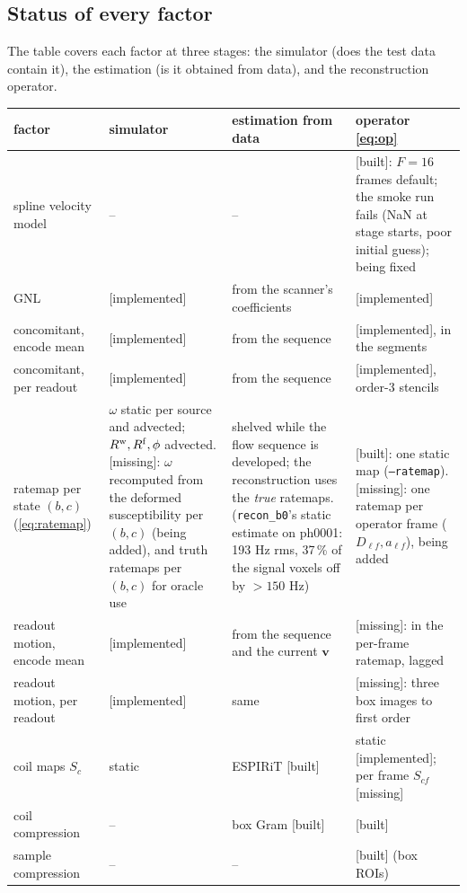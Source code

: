 \documentclass[11pt]{article}
\theoremstyle{remark}
\newcommand{\vv}{\bm v}
\newcommand{\st}[1]{\textsf{\small[#1]}}
\begin{document}
\subsection{Status of every factor}
\label{sec:chainstatus}

The table covers each factor at three stages: the simulator (does the test data contain it), the estimation (is it obtained from data), and the reconstruction operator.
\begin{center}\small
\begin{tabularx}{\linewidth}{@{}lXXX@{}}
\toprule
factor & simulator & estimation from data & operator \cref{eq:op}\\
\midrule
spline velocity model & -- & -- & \st{built}: $F=16$ frames default; the smoke run fails (NaN at stage starts, poor initial guess); being fixed\\
GNL & \st{implemented} & from the scanner's coefficients & \st{implemented}\\
concomitant, encode mean & \st{implemented} & from the sequence & \st{implemented}, in the segments\\
concomitant, per readout & \st{implemented} & from the sequence & \st{implemented}, order-3 stencils\\
ratemap per state $(b,c)$ (\cref{eq:ratemap}) & $\omega$ static per source and advected; $R^{\rm w},R^{\rm f},\phi$ advected. \st{missing}: $\omega$ recomputed from the deformed susceptibility per $(b,c)$ (being added), and truth ratemaps per $(b,c)$ for oracle use & shelved while the flow sequence is developed; the reconstruction uses the \emph{true} ratemaps. (\texttt{recon\_b0}'s static estimate on ph0001: 193 Hz rms, 37\,\% of the signal voxels off by $>150$ Hz) & \st{built}: one static map (\texttt{--ratemap}). \st{missing}: one ratemap per operator frame ($D_{\ell f},a_{\ell f}$), being added\\
readout motion, encode mean & \st{implemented} & from the sequence and the current $\vv$ & \st{missing}: in the per-frame ratemap, lagged\\
readout motion, per readout & \st{implemented} & same & \st{missing}: three box images to first order\\
coil maps $S_c$ & static & ESPIRiT \st{built} & static \st{implemented}; per frame $S_{cf}$ \st{missing}\\
coil compression & -- & box Gram \st{built} & \st{built}\\
sample compression & -- & -- & \st{built} (box ROIs)\\
\bottomrule
\end{tabularx}
\end{center}
\end{document}
